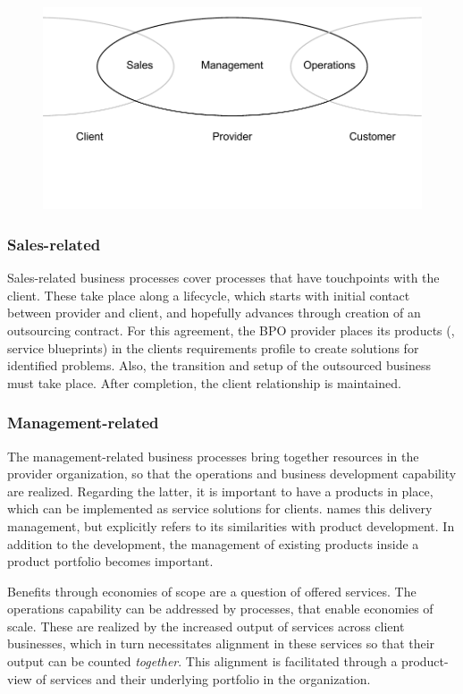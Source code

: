	
	\begin{figure}[caption={BPO chain provider scope with stakeholders}, label={fig:bpochainscope}]
		{	\includegraphics[width=.8\textwidth]{figures/chain2.pdf}}
	\end{figure} 
	
	\subsubsection{Sales-related}
	Sales-related business processes cover processes that have touchpoints with the client. These take place along a lifecycle, which starts with initial contact between provider and client, and hopefully advances through creation of an outsourcing contract. For this agreement, the \acrshort{BPO} provider places its products (\ie, service blueprints) in the clients requirements profile to create solutions for identified problems. Also, the transition and setup of the outsourced business must take place. After completion, the client relationship is maintained.
	
	\subsubsection{Management-related}
	The management-related business processes bring together resources in the provider organization, so that the operations and business development capability are realized. Regarding the latter, it is important to have a products in place, which can be implemented as service solutions for clients. \cite{schewe2007} names this delivery management, but explicitly refers to its similarities with product development. In addition to the development, the management of existing products inside a product portfolio becomes important. 
	
	Benefits through economies of scope are a question of offered services. The operations capability can be addressed by processes, that enable economies of scale. These are realized by the increased output of services across client businesses, which in turn necessitates alignment in these services so that their output can be counted \textit{together}. This alignment is facilitated through a product-view of services and their underlying portfolio in the organization. 
	
